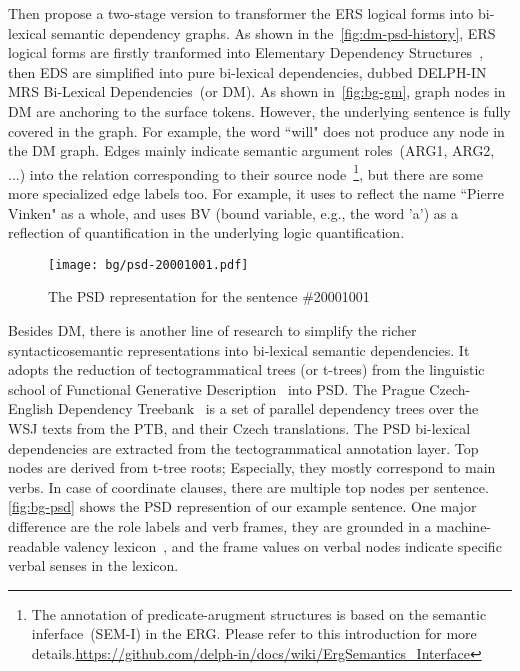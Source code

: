 Then \citet{Iva:Oep:Ovr:12} propose a two-stage version to transformer
the ERS logical forms into bi-lexical semantic dependency graphs. As
shown in the~\autoref{fig:dm-psd-history}, ERS logical forms are
firstly tranformed into Elementary Dependency
Structures~\cite[EDS,][]{Oep:Lon:06}, then EDS are simplified into
pure bi-lexical dependencies, dubbed DELPH-IN MRS Bi-Lexical
Dependencies~(or DM). As shown in~\autoref{fig:bg-gm}, graph nodes in
DM are anchoring to the surface tokens. However, the underlying
sentence is fully covered in the graph. For example, the word ``will"
does not produce any node in the DM graph. Edges mainly indicate
semantic argument roles~(ARG1, ARG2, ...) into the relation
corresponding to their source node~\footnote{The annotation of
  predicate-arugment structures is based on the semantic
  inferface~(SEM-I) in the ERG. Please refer to this introduction for
  more
  details.\url{https://github.com/delph-in/docs/wiki/ErgSemantics_Interface}},
but there are some more specialized edge labels too. For example, it
uses  to reflect the name ``Pierre Vinken" as a whole,
and uses BV (bound variable, e.g., the word 'a') as a reflection of
quantification in the underlying logic quantification.

\begin{figure}[!th]
\centering
\texttt{[image: bg/psd-20001001.pdf]}
\caption{\label{fig:bg-psd}The PSD representation for the sentence
  \#20001001}
\end{figure}


 Besides DM, there is another
line of research to simplify the richer syntacticosemantic
representations into bi-lexical semantic dependencies.  It adopts the
reduction of tectogrammatical trees (or t-trees) from the linguistic
school of Functional Generative
Description~\citep[FGD,][]{Sga:Haj:Pan:86,hajic2012announcing} into
PSD. The Prague Czech-English Dependency
Treebank~\citep[PCEDT,][]{hajic2012announcing} is a set of parallel
dependency trees over the WSJ texts from the PTB, and their Czech
translations. The PSD bi-lexical dependencies are extracted from the
tectogrammatical annotation layer. Top nodes are derived from t-tree
roots; Especially, they mostly correspond to main verbs. In case of
coordinate clauses, there are multiple top nodes per
sentence. \autoref{fig:bg-psd} shows the PSD represention of our
example sentence. One major difference are the role labels and verb
frames, they are grounded in a machine-readable valency
lexicon~\citep{urevsova2016czengvallex}, and the frame values on
verbal nodes indicate specific verbal senses in the lexicon.

